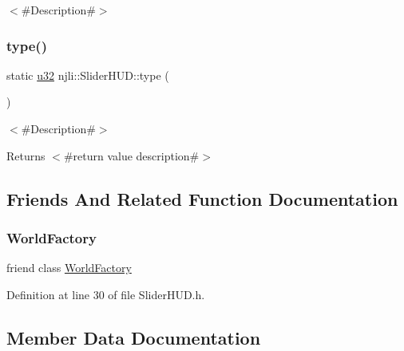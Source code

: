 $<$\#\+Description\#$>$ \mbox{\label{classnjli_1_1_slider_h_u_d_ad0d5a4c37308654054255e7f261364c7}} 
\subsubsection{\texorpdfstring{type()}{type()}}
{\footnotesize\ttfamily static \mbox{\hyperlink{_util_8h_a10e94b422ef0c20dcdec20d31a1f5049}{u32}} njli\+::\+Slider\+H\+U\+D\+::type (\begin{DoxyParamCaption}{ }\end{DoxyParamCaption})\hspace{0.3cm}{\ttfamily [static]}}

$<$\#\+Description\#$>$

\begin{DoxyReturn}{Returns}
$<$\#return value description\#$>$ 
\end{DoxyReturn}


\subsection{Friends And Related Function Documentation}
\mbox{\label{classnjli_1_1_slider_h_u_d_acb96ebb09abe8f2a37a915a842babfac}} 
\subsubsection{\texorpdfstring{World\+Factory}{WorldFactory}}
{\footnotesize\ttfamily friend class \mbox{\hyperlink{classnjli_1_1_world_factory}{World\+Factory}}\hspace{0.3cm}{\ttfamily [friend]}}



Definition at line 30 of file Slider\+H\+U\+D.\+h.



\subsection{Member Data Documentation}
\mbox{\label{classnjli_1_1_slider_h_u_d_a0b02cb21788a357fb319b8e788338196}} 
